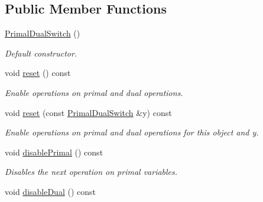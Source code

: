 \subsection*{Public Member Functions}
\begin{DoxyCompactItemize}
\item 
\hypertarget{classSpacy_1_1Mixin_1_1PrimalDualSwitch_aad338d204eae400484cf23e474c06c7f}{}\hyperlink{classSpacy_1_1Mixin_1_1PrimalDualSwitch_aad338d204eae400484cf23e474c06c7f}{Primal\+Dual\+Switch} ()\label{classSpacy_1_1Mixin_1_1PrimalDualSwitch_aad338d204eae400484cf23e474c06c7f}

\begin{DoxyCompactList}\small\item\em Default constructor. \end{DoxyCompactList}\item 
\hypertarget{classSpacy_1_1Mixin_1_1PrimalDualSwitch_a046abcbcce6510a13fd2191ee9bfdf2f}{}void \hyperlink{classSpacy_1_1Mixin_1_1PrimalDualSwitch_a046abcbcce6510a13fd2191ee9bfdf2f}{reset} () const \label{classSpacy_1_1Mixin_1_1PrimalDualSwitch_a046abcbcce6510a13fd2191ee9bfdf2f}

\begin{DoxyCompactList}\small\item\em Enable operations on primal and dual operations. \end{DoxyCompactList}\item 
\hypertarget{classSpacy_1_1Mixin_1_1PrimalDualSwitch_a8d9290958a7571e0b09c63c07ade91f3}{}void \hyperlink{classSpacy_1_1Mixin_1_1PrimalDualSwitch_a8d9290958a7571e0b09c63c07ade91f3}{reset} (const \hyperlink{classSpacy_1_1Mixin_1_1PrimalDualSwitch}{Primal\+Dual\+Switch} \&y) const \label{classSpacy_1_1Mixin_1_1PrimalDualSwitch_a8d9290958a7571e0b09c63c07ade91f3}

\begin{DoxyCompactList}\small\item\em Enable operations on primal and dual operations for this object and y. \end{DoxyCompactList}\item 
\hypertarget{classSpacy_1_1Mixin_1_1PrimalDualSwitch_af6d731770318c8dbee103f11038b45bd}{}void \hyperlink{classSpacy_1_1Mixin_1_1PrimalDualSwitch_af6d731770318c8dbee103f11038b45bd}{disable\+Primal} () const \label{classSpacy_1_1Mixin_1_1PrimalDualSwitch_af6d731770318c8dbee103f11038b45bd}

\begin{DoxyCompactList}\small\item\em Disables the next operation on primal variables. \end{DoxyCompactList}\item 
\hypertarget{classSpacy_1_1Mixin_1_1PrimalDualSwitch_a09c50ff45a46f2a472860ef34911441b}{}void \hyperlink{classSpacy_1_1Mixin_1_1PrimalDualSwitch_a09c50ff45a46f2a472860ef34911441b}{disable\+Dual} () const \label{classSpacy_1_1Mixin_1_1PrimalDualSwitch_a09c50ff45a46f2a472860ef34911441b}


\end{DoxyCompactItemize}
